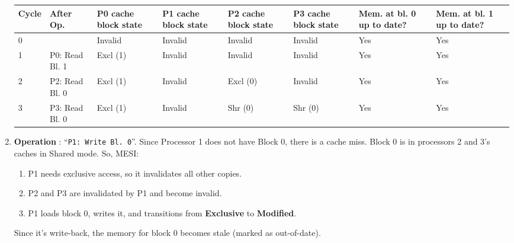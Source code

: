 \begin{enumerate}
    \begin{table}[!htp]
        \centering
        \begin{adjustbox}{width={\textwidth},totalheight={\textheight},keepaspectratio}
            \begin{tabular}{@{} l l p{4em} p{4em} p{4em} p{4em} p{3em} p{3em} @{}}
                \toprule
                \textbf{Cycle} & \textbf{After Op.} & \textbf{P0 cache block state} & \textbf{P1 cache block state} & \textbf{P2 cache block state} & \textbf{P3 cache block state} & \textbf{Mem. at bl. 0 up to date?} & \textbf{Mem. at bl. 1 up to date?} \\
                \midrule
                0   &                   & Invalid   & Invalid   & Invalid   & Invalid   & Yes   & Yes   \\ [.3em]
                1   & P0: Read Bl. 1    & Excl (1)  & Invalid   & Invalid   & Invalid   & Yes   & Yes   \\ [.3em]
                2   & P2: Read Bl. 0    & Excl (1)  & Invalid   & Excl (0)  & Invalid   & Yes   & Yes   \\ [.3em]
                3   & P3: Read Bl. 0    & Excl (1)  & Invalid   & Shr (0)   & Shr (0)   & Yes   & Yes   \\
                \bottomrule
            \end{tabular}
        \end{adjustbox}
    \end{table}


    \item \textbf{Operation \theenumi}: ``\texttt{P1: Write Bl. 0}''. Since Processor 1 does not have Block 0, there is a cache miss. Block 0 is in processors 2 and 3's caches in Shared mode. So, MESI:
    \begin{enumerate}
        \item P1 needs exclusive access, so it invalidates all other copies.
        \item P2 and P3 are invalidated by P1 and become invalid.
        \item P1 loads block 0, writes it, and transitions from \textbf{Exclusive} to \textbf{Modified}.
    \end{enumerate}
    Since it's write-back, the memory for block 0 becomes stale (marked as out-of-date).


\end{enumerate}
